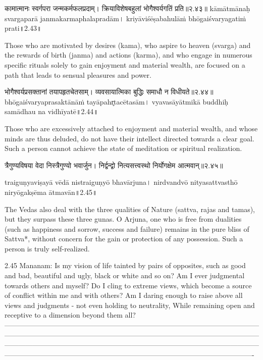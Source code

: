 कामात्मानः स्वर्गपरा जन्मकर्मफलप्रदाम्।
 क्रियाविशेषबहुलां भोगैश्वर्यगतिं प्रति॥२.४३॥
kāmātmānaḥ svargaparā janmakarmaphalapradām।
kriyāviśēṣabahulāṁ bhōgaiśvaryagatiṁ prati॥2.43॥

Those who are motivated by desires (kama), who aspire to heaven (svarga) and the rewards of birth (janma) and actions (karma), and who engage in numerous specific rituals solely to gain enjoyment and material wealth, are focused on a path that leads to sensual pleasures and power.

भोगैश्वर्यप्रसक्तानां तयापहृतचेतसाम्।
व्यवसायात्मिका बुद्धिः समाधौ न विधीयते॥२.४४॥
bhōgaiśvaryaprasaktānāṁ tayāpahr̥tacētasām।
vyavasāyātmikā buddhiḥ samādhau na vidhīyatē॥2.44॥

Those who are excessively attached to enjoyment and material wealth, and whose minds are thus deluded, do not have their intellect directed towards a clear goal. Such a person cannot achieve the state of meditation or spiritual realization.

त्रैगुण्यविषया वेदा निस्त्रैगुण्यो भवार्जुन। 
निर्द्वन्द्वो नित्यसत्त्वस्थो निर्योगक्षेम आत्मवान्॥२.४५॥

traiguṇyaviṣayā vēdā nistraiguṇyō bhavārjuna। 
nirdvandvō nityasattvasthō niryōgakṣēma ātmavān॥2.45॥

The Vedas also deal with the three qualities of Nature (sattva, rajas and tamas), but they surpass these three gunas. O Arjuna, one who is free from dualities (such as happiness and sorrow, success and failure) remains in the pure bliss of Sattva*, without concern for the gain or protection of any possession. Such a person is truly self-realized.

2.45 Mananam: 
Is my vision of life tainted by pairs of opposites, such as good and bad, beautiful and ugly, black or white and so on? Am I ever judgmental towards others and myself? Do I cling to extreme views, which become a source of conflict within me and with others? Am I daring enough to raise above all views and judgments - not even holding to neutrality, While remaining open and receptive to a dimension beyond them all?
—-------------------------------------------------------------------------------------------------------------------------------------------------------------------------------------------------------------------------------------------------------------------------------------------------------------------------------------------------------------------------------------------------------------------------------------------
 
